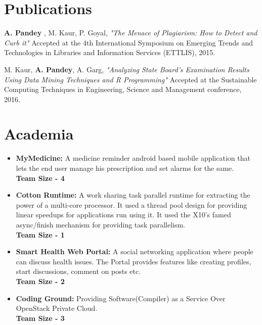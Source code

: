 \documentclass[letterpaper]{deedy-resume} %
\begin{document}
\begin{minipage}[t]{0.66\textwidth}
				 \sectionspace %


				 \section{Publications}
				 \vspace{2mm}
				 \begin{tightitemize}
				 \item {\textbf{A. Pandey }, M. Kaur, P. Goyal, \textit {"The Menace of Plagiarism: How to Detect and Curb it"}
					 Accepted at the 4th International Symposium on Emerging Trends and Technologies
						 in Libraries and Information Services (ETTLIS), 2015. }

						 \item {M. Kaur, \textbf{A. Pandey}, A. Garg, \textit{"Analyzing State Board’s Examination Results Using
							 Data Mining Techniques and R Programming"} Accepted at the Sustainable Computing
								 Techniques in Engineering, Science and Management conference, 2016.}

								 \end{tightitemize}

								 \sectionspace %


								 \section{Academia}

								 \begin{itemize}
								 \item {\textbf{MyMedicine:} A medicine reminder android based mobile application that lets the end user manage his prescription and set alarms for the same. \\ \textbf{Team Size - 4}}
								 \item {\textbf{Cotton Runtime: }A work sharing task parallel runtime for extracting the power of a multi-core processor. It used a thread pool design for providing linear speedups for applications run using it. It used the X10’s famed async/finish mechanism for providing task parallelism. \\ \textbf{Team Size - 1}}
								 \item {\textbf{Smart Health Web Portal: } A social networking application where people can discuss health issues. The Portal provides features like creating profiles, start discussions, comment on posts etc.\\ \textbf{Team Size - 2}}
								 \item {\textbf{Coding Ground: } Providing Software(Compiler) as a Service Over OpenStack Private Cloud. \\ \textbf{Team Size - 3}}
								 \end{itemize}


\end{minipage}
\end{document}
